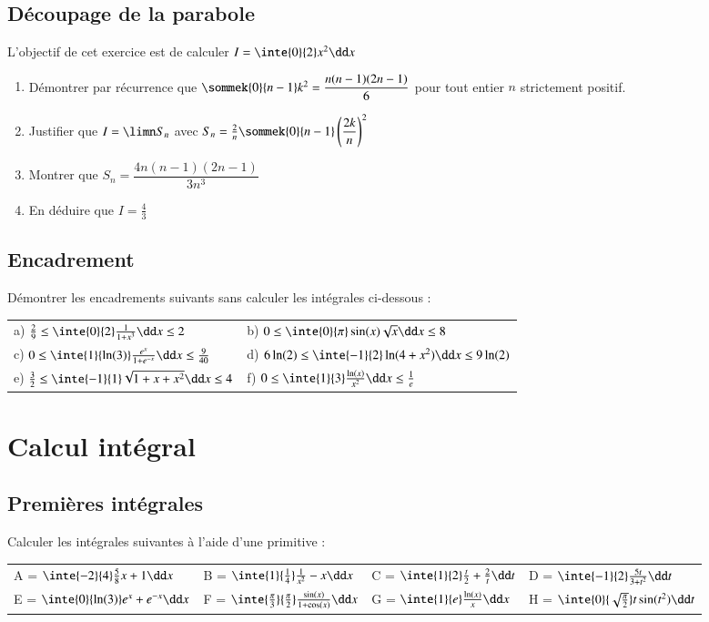 \documentclass[oneside,12pt]{article}          %
\begin{document}
\subsection{Découpage de la parabole}
L'objectif de cet exercice est de calculer $I=\inte{0}{2}x^2 \dd x$
\begin{enumerate}
	\item Démontrer par récurrence que $\sommek{0}{n-1}k^2 = \dfrac{n(n-1)(2n-1)}{6}$ pour tout entier $n$ strictement positif.
	\item Justifier que $I=\limn S_n$ avec $S_n=\frac{2}{n}\sommek{0}{n-1}\left(\dfrac{2k}{n}\right)^2$
	\item Montrer que $S_n=\dfrac{4n(n-1)(2n-1)}{3n^3}$
	\item En déduire que $I=\frac{4}{3}$
\end{enumerate}



\subsection{Encadrement}
Démontrer les encadrements suivants sans calculer les intégrales ci-dessous :\\
\begin{tabular}{p{} p{}}
        a) $\frac{2}{9}\leq\inte{0}{2}\frac{1}{1+x^3}\dd x\leq2$ & b) $0\leq\inte{0}{\pi}\sin(x)\sqrt{x}\dd x\leq8$ \\
        c) $0\leq\inte{1}{\ln(3)}\frac{e^x}{1+e^{-x}}\dd x\leq\frac{9}{40}$ & d) $6\ln(2)\leq\inte{-1}{2}\ln(4+x^2)\dd x\leq9\ln(2)$ \\
        e) $\frac{3}{2}\leq\inte{-1}{1}\sqrt{1+x+x^2}\dd x\leq4$ & f) $0\leq\inte{1}{3}\frac{\ln(x)}{x^2}\dd x\leq\frac{1}{e}$
\end{tabular}



\section{Calcul intégral}

\subsection{Premières intégrales}
Calculer les intégrales suivantes à l'aide d'une primitive :

\begin{tabular}{p{} p{} p{} p{}}
    A = $\inte{-2}{4}\frac{5}{8}x+1\dd x$ & B = $\inte{1}{\frac{1}{4}}\frac{1}{x^2}-x \dd x$ & C = $\inte{1}{2}\frac{t}{2}+\frac{2}{t}\dd t$ & D = $\inte{-1}{2}\frac{5t}{3+t^2}\dd t$ \\
    E = $\inte{0}{\ln(3)}e^x+e^{-x}\dd x$ & F = $\inte{\frac{\pi}{3}}{\frac{\pi}{2}}\frac{\sin(x)}{1+\cos(x)}\dd x$ & G = $\inte{1}{e}\frac{\ln(x)}{x}\dd x$ & H = $\inte{0}{\sqrt{\frac{\pi}{2}}}t\sin(t^2)\dd t$
\end{tabular}
\end{document}
